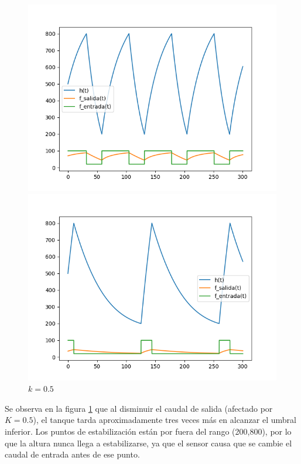 \documentclass[12pt]{article}
\begin{document}
\begin{figure}[ht] \centering
	\begin{minipage}{0.45\textwidth}
		\centering
		\includegraphics[width=\linewidth]{osck1}
		\caption{$k = 1$}
		\label{gr:osck1}
	\end{minipage}
	\begin{minipage}{0.45\textwidth}
		\centering
		\includegraphics[width=\linewidth]{osck05}
		\caption{$k = 0.5$}
		\label{gr:osck05}
	\end{minipage}
\end{figure}

Se observa en la figura \ref{gr:osck05} que al disminuir el caudal de salida (afectado por $K=0.5$), el tanque tarda aproximadamente tres veces más en alcanzar el umbral inferior. Los puntos de estabilización están por fuera del rango (200,800), por lo que la altura nunca llega a estabilizarse, ya que el sensor causa que se cambie el caudal de entrada antes de ese punto.
\end{document}
